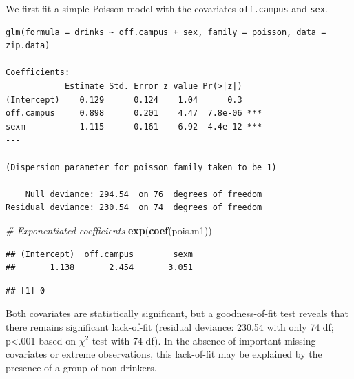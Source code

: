 \documentclass[
]{krantz}
\newenvironment{Shaded}{\begin{snugshade}}{\end{snugshade}}
\newcommand{\CommentTok}[1]{\textcolor[rgb]{0.37,0.37,0.37}{\textit{#1}}}
\newcommand{\DecValTok}[1]{\textcolor[rgb]{0.06,0.06,0.06}{#1}}
\newcommand{\KeywordTok}[1]{\textcolor[rgb]{0.27,0.27,0.27}{\textbf{#1}}}
\newcommand{\NormalTok}[1]{#1}
\newcommand{\OperatorTok}[1]{\textcolor[rgb]{0.43,0.43,0.43}{\textbf{#1}}}
\newcommand{\StringTok}[1]{\textcolor[rgb]{0.5,0.5,0.5}{#1}}
\begin{document}
We first fit a simple Poisson model with the covariates \texttt{off.campus} and \texttt{sex}.

\begin{verbatim}
glm(formula = drinks ~ off.campus + sex, family = poisson, data = zip.data)

Coefficients:
            Estimate Std. Error z value Pr(>|z|)    
(Intercept)    0.129      0.124    1.04      0.3    
off.campus     0.898      0.201    4.47  7.8e-06 ***
sexm           1.115      0.161    6.92  4.4e-12 ***
---

(Dispersion parameter for poisson family taken to be 1)

    Null deviance: 294.54  on 76  degrees of freedom
Residual deviance: 230.54  on 74  degrees of freedom
\end{verbatim}

\begin{Shaded}
\begin{Highlighting}[]
\CommentTok{# Exponentiated coefficients}
\KeywordTok{exp}\NormalTok{(}\KeywordTok{coef}\NormalTok{(pois.m1))}
\end{Highlighting}
\end{Shaded}

\begin{verbatim}
## (Intercept)  off.campus        sexm 
##       1.138       2.454       3.051
\end{verbatim}

\begin{Shaded}
\end{Shaded}

\begin{verbatim}
## [1] 0
\end{verbatim}

Both covariates are statistically significant, but a goodness-of-fit test reveals that there remains significant lack-of-fit (residual deviance: 230.54 with only 74 df; p\textless.001 based on \(\chi^2\) test with 74 df). In the absence of important missing covariates or extreme observations, this lack-of-fit may be explained by the presence of a group of non-drinkers.
\end{document}
